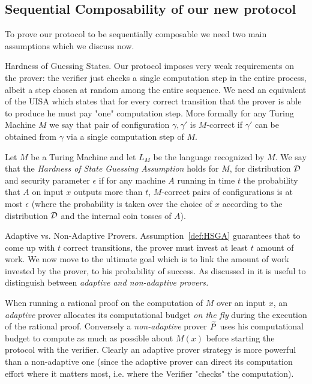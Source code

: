 \subsection{Sequential Composability of our new protocol}
\label{sec:scproof}

To prove our protocol to be sequentially composable we need two main assumptions which we discuss now. 

\medskip
\noindent
{\sc Hardness of Guessing States.}
Our protocol imposes very weak requirements on the prover: the verifier just checks a single computation step in the entire process, albeit a step chosen at random among the entire sequence. We need an equivalent of the UISA which states that for every correct transition that the prover is able to produce he must pay "one" computation step. More formally for any Turing Machine 
$M$ we say that pair of configuration $\gamma,\gamma'$ is $M$-correct if $\gamma'$ can be obtained from $\gamma$ via a single computation step of $M$. 
\begin{definition}
\label{def:HSGA}
Let $M$ be a Turing Machine and let $L_M$ be the language recognized by $M$. We say that the {\em Hardness of State Guessing Assumption} holds for $M$, for distribution $\cal D$ and security parameter $\epsilon$ if for any machine $A$ running in time $t$ the probability that $A$ on input $x$ outputs more than $t$, $M$-correct pairs of configurations is at most $\epsilon$ (where the probability is taken over the choice of $x$ according to the distribution $\cal D$ and the internal coin tosses of $A$). 
\end{definition}

\medskip
\noindent
{\sc Adaptive vs. Non-Adaptive Provers.}
Assumption~\ref{def:HSGA} guarantees that to come up with $t$ correct transitions, the prover must invest at least $t$ amount of work. We now move to the ultimate goal which is to link the amount of work invested by the prover, to his probability of success. 
As discussed in \cite{cg15} it is useful to distinguish between {\em adaptive and non-adaptive provers.}

When running a rational proof on the computation of $M$ over an input $x$, an {\em adaptive} prover allocates its computational budget  {\em on the fly} during the execution of the rational proof. Conversely a {\em non-adaptive} prover $\widetilde{P}$ uses his computational budget to compute as much as possible about $M(x)$ before starting the protocol with the verifier. Clearly an adaptive prover strategy is more powerful than a non-adaptive one (since the adaptive prover can direct its computation effort where it matters most, i.e. where the Verifier "checks" the computation).

